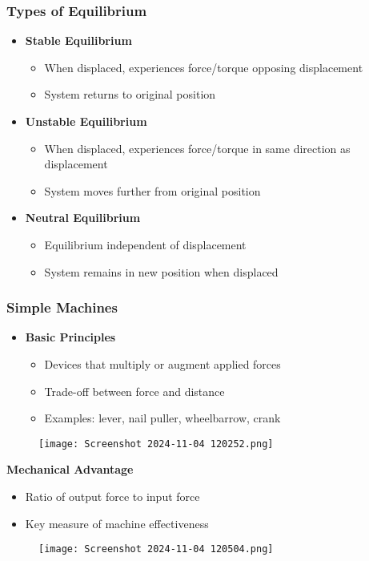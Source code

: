 \documentclass{beamer}
\begin{document}
\begin{frame}
\frametitle{Types of Equilibrium}
\begin{itemize}
    \item \textbf{Stable Equilibrium}
    \begin{itemize}
        \item When displaced, experiences force/torque opposing displacement
        \item System returns to original position
    \end{itemize}
    \item \textbf{Unstable Equilibrium}
    \begin{itemize}
        \item When displaced, experiences force/torque in same direction as displacement
        \item System moves further from original position
    \end{itemize}
    \item \textbf{Neutral Equilibrium}
    \begin{itemize}
        \item Equilibrium independent of displacement
        \item System remains in new position when displaced
    \end{itemize}
\end{itemize}
\end{frame}

\begin{frame}
\frametitle{Simple Machines}
\begin{itemize}
    \item \textbf{Basic Principles}
    \begin{itemize}
        \item Devices that multiply or augment applied forces
        \item Trade-off between force and distance
        \item Examples: lever, nail puller, wheelbarrow, crank
    \end{itemize}
    \end{itemize}
\begin{figure}[H]
    \centering
    \texttt{[image: Screenshot 2024-11-04 120252.png]}
\end{figure}
    
\end{frame}



\begin{frame}
    \item \textbf{Mechanical Advantage}
    \begin{itemize}
        \item Ratio of output force to input force
        \item Key measure of machine effectiveness
    \end{itemize}
\begin{figure}[H]
    \centering
    \texttt{[image: Screenshot 2024-11-04 120504.png]}
\end{figure}
    
\end{frame}
\end{document}
